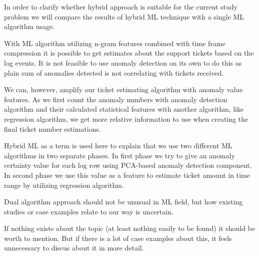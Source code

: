In order to clarify whether hybrid approach is suitable for the current study problem
we will compare the results of hybrid ML technique
with a single ML algorithm usage.




With ML algorithm utilizing n-gram features combined with time frame compression
it is possible to get estimates
about the support tickets based on the log events.
It is not feasible to use anomaly detection on its own to do this
as plain sum of anomalies detected
is not correlating with tickets received.

We can, however,
amplify our ticket estimating algorithm with anomaly value features.
As we first count the anomaly numbers with anomaly detection algorithm %
and their calculated statistical features with another algorithm,
like regression algorithm,
we get more relative information to use
when creating the final ticket number estimations. %



\begin{itcomment}
    Hybrid ML as a term is used here to explain that we
    use two different ML algorithms in two separate phases.
    In first phase we try to give an anomaly certainty value for each log row
    using PCA-based anomaly detection component.
    In second phase we use this value as a feature to estimate ticket amount in time range
    by utilizing regression algorithm.

    Dual algorithm approach should not be unusual in ML field,
    but how existing studies or case examples relate to our way is uncertain.

    If nothing exists about the topic (at least nothing easily to be found)
    it should be worth to mention.
    But if there is a lot of case examples about this, it feels unnecessary
    to discus about it in more detail.
\end{itcomment}


\clearpage